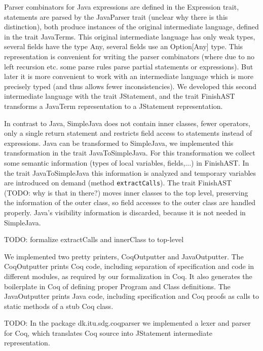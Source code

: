 \documentclass{article}
\begin{document}
Parser combinators for Java expressions are defined in the Expression trait, statements are parsed by the JavaParser trait (unclear why there is this distinction), both produce instances of the original intermediate language, defined in the trait JavaTerms. This original intermediate language has only weak types, several fields have the type Any, several fields use an Option[Any] type. This representation is convenient for writing the parser combinators (where due to no left recursion etc. some parse rules parse partial statements or expressions). But later it is more convenient to work with an intermediate language which is more precisely typed (and thus allows fewer inconsistencies). We developed this second intermediate language with the trait JStatement, and the trait FinishAST transforms a JavaTerm representation to a JStatement representation.

In contrast to Java, SimpleJava does not contain inner classes, fewer operators, only a single return statement and restricts field access to statements instead of expressions. Java can be transformed to SimpleJava, we implemented this transformation in the trait JavaToSimpleJava. For this transformation we collect some semantic information (types of local variables, fields,...) in FinishAST. In the trait JavaToSimpleJava this information is analyzed and temporary variables are introduced on demand (method \texttt{extractCalls}). The trait FinishAST (TODO: why is that in there?) moves inner classes to the top level, preserving the information of the outer class, so field accesses to the outer class are handled properly. Java's visibility information is discarded, because it is not needed in SimpleJava.

TODO: formalize extractCalls and innerClass to top-level

We implemented two pretty printers, CoqOutputter and JavaOutputter. The CoqOutputter prints Coq code, including separation of specification and code in different modules, as required by our formalization in Coq. It also generates the boilerplate in Coq of defining proper Program and Class definitions. The JavaOutputter prints Java code, including specification and Coq proofs as calls to static methods of a stub Coq class.

TODO: In the package dk.itu.sdg.coqparser we implemented a lexer and parser for Coq, which translates Coq source into JStatement intermediate representation.
\end{document}

